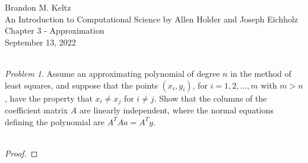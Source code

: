 \documentclass{article}
\begin{document}
	\begin{flushleft}

		Brandon M. Keltz\\
		An Introduction to Computational Science by Allen Holder and Joseph Eichholz\\
		Chapter 3 - Approximation\\
		September 13, 2022\\\

		\textit{Problem 1}. Assume an approximating polynomial of degree $n$ in the method of least squares, and suppose that the points $(x_i, y_i)$, for $i = 1, 2, \ldots, m$ with $m > n$, have the property that $x_i \neq x_j$ for $i \neq j$. Show that the columns of the coefficient matrix $A$ are linearly independent, where the normal equations defining the polynomial are $A^T A a = A^T y$. \\\

		\begin{proof}

			

		\end{proof}

	\end{flushleft}
\end{document}
